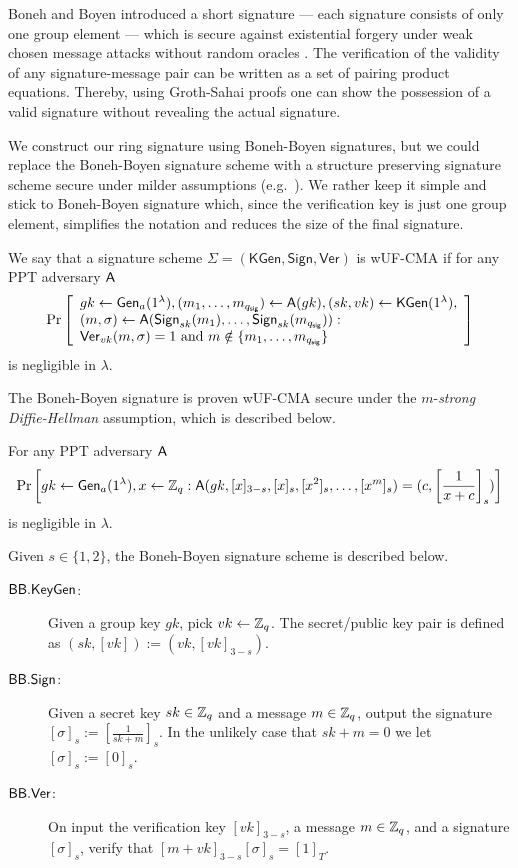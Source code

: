 

Boneh and Boyen introduced a short signature --- each signature consists of only one group element --- which is secure against existential forgery under weak chosen message attacks without random oracles \cite{EC:BonBoy04a}.
The verification of the validity of any signature-message pair can be written as a set of pairing product equations. Thereby, using Groth-Sahai proofs one can show the possession of a valid signature without revealing the actual signature.

We construct our ring signature using Boneh-Boyen signatures, but we could replace the Boneh-Boyen signature scheme with a structure preserving signature scheme secure under milder assumptions (e.g.~\cite{EPRINT:JutRoy17}). We rather keep it simple and stick to Boneh-Boyen signature which, since the verification key is just one group element, simplifies the notation and reduces the size of the final signature.
 
\begin{definition} We say that a signature scheme $\Sigma = (\mathsf{KGen},\mathsf{Sign},\mathsf{Ver})$ is wUF-CMA if for any PPT adversary $\mathsf{A}$
	$$
	\Pr\left[\begin{array}{l}
	gk \gets \mathsf{Gen}_a(1^\lambda), (m_1,\ldots,m_{q_\mathsf{sig}})\gets\mathsf{A}(gk), (sk,vk)\gets\mathsf{KGen}(1^\lambda), \\
	(m,\sigma)\gets\mathsf{A}(\mathsf{Sign}_{sk}(m_1),\ldots,\mathsf{Sign}_{sk}(m_{q_\mathsf{sig}})):\\
	\mathsf{Ver}_{vk}(m,\sigma)=1 \text{ and } m\notin \{m_1,\ldots,m_{q_\mathsf{sig}}\}
	\end{array}\right]
	$$
is negligible in $\lambda$.
\end{definition}

The Boneh-Boyen signature is proven wUF-CMA secure under the $m$-\emph{strong Diffie-Hellman} assumption, which is described below.

\begin{definition}
For any PPT adversary $\mathsf{A}$
$$
\Pr\left[gk\gets\mathsf{Gen}_a(1^\lambda),x\gets\mathbb{Z}_q:\mathsf{A}(gk,[x]_{3-s},[x]_s,[x^2]_s,\ldots,[x^m]_s)=(c,\left[\frac{1}{x+c}\right]_s)\right]
$$
is negligible in $\lambda$.
\end{definition}

Given $s\in\{1,2\}$, the Boneh-Boyen signature scheme is described below.

\begin{description}
\item[$\mathsf{BB}.\mathsf{KeyGen}$:] Given a group key $gk$, pick $vk\gets\mathbb{Z}_q$. The secret/public key pair is defined as $(sk,[vk]):=(vk,[vk]_{3-s})$.
\item[$\mathsf{BB}.\mathsf{Sign}$:] Given a secret key $sk\in\mathbb{Z}_q$ and a message $m\in\mathbb{Z}_q$, output the signature $[\sigma]_{s}:=\left[\frac{1}{sk+m}\right]_{s}$. In the unlikely case that $sk+m=0$ we let $[\sigma]_{s}:=[0]_{s}$.
\item[$\mathsf{BB}.\mathsf{Ver}$:] On input the verification key $[vk]_{3-s}$, a message $m\in\mathbb{Z}_q$, and a signature $[\sigma]_{s}$, verify that $[m+vk]_{3-s}[\sigma]_{s}=[1]_T$.
\end{description} 


